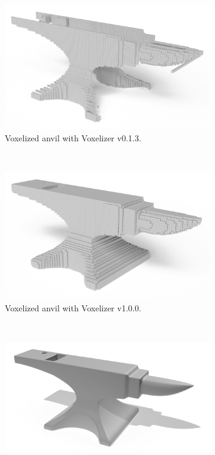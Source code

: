 \begin{figure}[hp!]
    \centering
    \begin{subfigure}[b]{0.7\textwidth}
        \centering
        \includegraphics[width=\textwidth]{sections/theory/figures/voxelizer-v013-anvil-128.png}
        \caption{Voxelized anvil with Voxelizer v0.1.3.}
        \label{fig:result-voxelizer-v0.1.3-anvil}
    \end{subfigure}
    \\
    \begin{subfigure}[b]{0.7\textwidth}
        \centering
        \includegraphics[width=\textwidth]{sections/result/figures/anvil-voxelized-v1-128.png}
        \caption{Voxelized anvil with Voxelizer v1.0.0.}
        \label{fig:result-voxelizer-v1-anvil}
    \end{subfigure}
    \\
    \begin{subfigure}[b]{0.7\textwidth}
        \centering
        \includegraphics[width=\textwidth]{sections/theory/figures/anvil.png}

\end{subfigure}
\end{figure}
